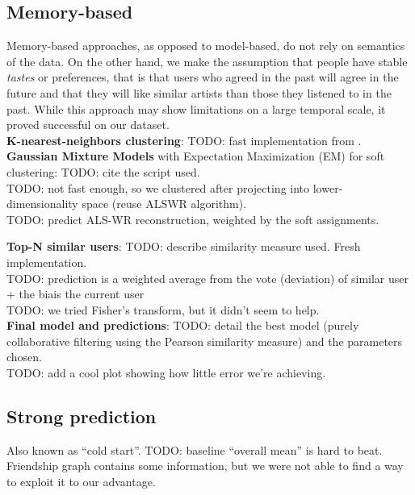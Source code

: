 \documentclass{article}
\begin{document}
  \subsection{Memory-based}
  Memory-based approaches, as opposed to model-based, do not rely on semantics of the data. On the other hand, we make the assumption that people have stable \textit{tastes} or preferences, that is that users who agreed in the past will agree in the future and that they will like similar artists than those they listened to in the past. While this approach may show limitations on a large temporal scale, it proved successful on our dataset.\\

    \noindent
    \textbf{K-nearest-neighbors clustering}:
    TODO: fast implementation from \cite{piotrtoolbox}.\\

    \noindent
    \textbf{Gaussian Mixture Models} with Expectation Maximization (EM) for soft clustering:
    TODO: cite the script used.\\
    TODO: not fast enough, so we clustered after projecting into lower-dimensionality space (reuse ALSWR algorithm).\\
    TODO: predict ALS-WR reconstruction, weighted by the soft assignments.

    \noindent
    \textbf{Top-N similar users}:
    TODO: describe similarity measure used. Fresh implementation.\\
    TODO: prediction is a weighted average from the vote (deviation) of similar user + the biais the current user\\
    TODO: we tried Fisher's transform, but it didn't seem to help.\\

    \noindent
    \textbf{Final model and predictions}:
    TODO: detail the best model (purely collaborative filtering using the Pearson similarity measure) and the parameters chosen.\\
    TODO: add a cool plot showing how little error we're achieving.

  \subsection{Strong prediction}
  Also known as ``cold start''.
  TODO: baseline ``overall mean'' is hard to beat. Friendship graph contains some information, but we were not able to find a way to exploit it to our advantage.\\
\end{document}
